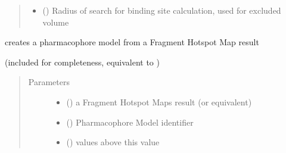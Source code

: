 \documentclass[letterpaper,10pt,english]{sphinxmanual}
\begin{document}
\begin{fulllineitems}
\begin{fulllineitems}
\begin{quote}
\begin{description}
\begin{itemize}
\item {} 
 () \textendash{} Radius of search for binding site calculation, used for excluded volume

\end{itemize}

\end{description}\end{quote}

\end{fulllineitems}


\begin{fulllineitems}
\label{\detokenize{hs_pharmacophore_api:hotspots.hs_pharmacophore.PharmacophoreModel.from_hotspot}}
creates a pharmacophore model from a Fragment Hotspot Map result

(included for completeness, equivalent to )
\begin{quote}\begin{description}
\item[{Parameters}] \leavevmode\begin{itemize}
\item {} 
 () \textendash{} a Fragment Hotspot Maps result (or equivalent)

\item {} 
 () \textendash{} Pharmacophore Model identifier

\item {} 
 () \textendash{} values above this value


\end{itemize}
\end{description}
\end{quote}
\end{fulllineitems}
\end{fulllineitems}
\end{document}

